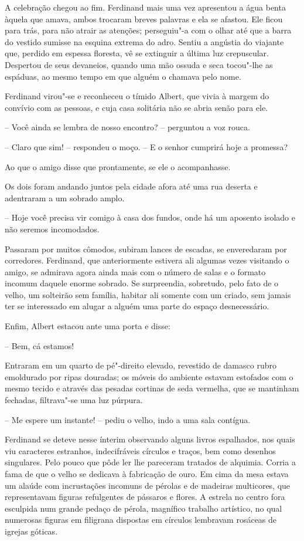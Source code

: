 A celebração chegou ao fim. Ferdinand mais uma vez apresentou a água
benta àquela que amava, ambos trocaram breves palavras e ela se
afastou. Ele ficou para trás, para não atrair as atenções; perseguiu"-a
com o olhar até que a barra do vestido sumisse na esquina extrema do
adro. Sentiu a angústia do viajante que, perdido em espessa floresta,
vê se extinguir a última luz crepuscular. Despertou de seus devaneios,
quando uma mão ossuda e seca tocou"-lhe as espáduas, ao mesmo tempo em
que alguém o chamava pelo nome. 

Ferdinand virou"-se e reconheceu o tímido Albert, que vivia à margem do
convívio com as pessoas, e cuja casa solitária não se abria senão para
ele.

-- Você ainda se lembra de nosso encontro? -- perguntou a voz rouca.

-- Claro que sim! -- respondeu o moço. -- E o senhor cumprirá hoje a promessa? 

Ao que o amigo disse que prontamente, se ele o acompanhasse. 

Os dois foram andando juntos pela cidade afora até uma rua deserta e
adentraram a um sobrado amplo. 

-- Hoje você precisa vir comigo à casa dos fundos, onde há um
aposento isolado e não seremos incomodados. 

Passaram por muitos cômodos, subiram lances de escadas, se enveredaram
por corredores. Ferdinand, que anteriormente estivera ali algumas vezes
visitando o amigo, se admirava agora ainda mais com o número de salas e
o formato incomum daquele enorme sobrado. Se surpreendia, sobretudo,
pelo fato de o velho, um solteirão sem família, habitar ali somente com
um criado, sem jamais ter se interessado em alugar a alguém uma parte
do espaço desnecessário. 

Enfim, Albert estacou ante uma porta e disse:

 -- Bem, cá estamos!

Entraram em um quarto de pé"-direito elevado, revestido de damasco rubro
emoldurado por ripas douradas; os móveis do ambiente estavam estofados
com o mesmo tecido e através das pesadas cortinas de seda vermelha, que
se mantinham fechadas, filtrava"-se uma luz púrpura. 

-- Me espere um instante! -- pediu o velho, indo a uma sala contígua.


Ferdinand se deteve nesse ínterim observando alguns livros espalhados,
nos quais viu caracteres estranhos, indecifráveis círculos e traços,
bem como desenhos singulares. Pelo pouco que pôde ler lhe pareceram
tratados de alquimia. Corria a fama de que o velho se dedicava à
fabricação de ouro. Em cima da mesa estava um alaúde com incrustações
incomuns de pérolas e de madeiras multicores, que representavam figuras
refulgentes de pássaros e flores. A estrela no centro fora esculpida
num grande pedaço de pérola, magnífico trabalho artístico, no qual
numerosas figuras em filigrana dispostas em círculos lembravam rosáceas
de igrejas góticas.


